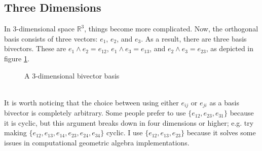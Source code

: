 \documentclass[10pt]{report}
\begin{document}
\newpage
\subsection{Three Dimensions}

In $3$-dimensional space $\mathbb{R}^3$, things become more
complicated. Now, the orthogonal basis consists of three vectors:
$e_{1}$, $e_{2}$, and $e_{3}$. As a result, there are three basis
bivectors. These are $e_{1}\wedge e_{2} = e_{12}$, $e_{1}\wedge
e_{3} = e_{13}$, and $e_{2}\wedge e_{3} = e_{23}$, as depicted in
figure \ref{fig:3d_bi_basis}.
\begin{figure}[ht]
\centering

\caption{A $3$-dimensional bivector basis} \label{fig:3d_bi_basis}
\end{figure}\\

It is worth noticing that the choice between using either $e_{ij}$
or $e_{ji}$ as a basis bivector is completely arbitrary. Some
people prefer to use $\{e_{12}, e_{23}, e_{31}\}$ because it is
cyclic, but this argument breaks down in four dimensions or
higher; e.g. try making $\{e_{12}, e_{13}, e_{14}, e_{23}, e_{24},
e_{34} \}$ cyclic. I use $\{e_{12}, e_{13}, e_{23}\}$ because it
solves some issues \cite{bib:suter c++
implementation} in computational geometric algebra
implementations.
\end{document}
